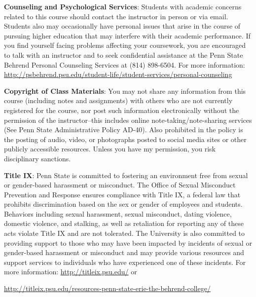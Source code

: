 \documentclass[11pt]{article}
\begin{document}
\vspace*{.10in}
\noindent\textbf{Counseling and Psychological Services}:
Students with academic concerns related to this course should contact the instructor in person or via email. Students also may occasionally have personal issues that arise in the course of pursuing higher education that may interfere with their academic performance. If you find yourself facing problems affecting your coursework, you are encouraged to talk with an instructor and to seek confidential assistance at the Penn State Behrend Personal Counseling Services at (814) 898-6504.
For more information: 
\url{http://psbehrend.psu.edu/student-life/student-services/personal-counseling}

\vspace*{.10in}
\noindent\textbf{Copyright of Class Materials}:
You may not share any information from this course (including notes and assignments) with others who are not currently registered for the course, nor post such information electronically without the permission of the instructor--this includes online note-taking/note-sharing services (See Penn State Administrative Policy AD-40).  Also prohibited in the policy is the posting of audio, video, or photographs posted to social media sites or other publicly accessible resources.  Unless you have my permission, you risk disciplinary sanctions.

\vspace*{.10in}
\noindent\textbf{Title IX}:
Penn State is committed to fostering an environment free from sexual or gender-based harassment or misconduct. The Office of Sexual Misconduct Prevention and Response ensures compliance with Title IX, a federal law that prohibits discrimination based on the sex or gender of employees and students.  Behaviors including sexual harassment, sexual misconduct, dating violence, domestic violence, and stalking, as well as retaliation for reporting any of these acts violate Title IX and are not tolerated. The University is also committed to providing support to those who may have been impacted by incidents of sexual or gender-based harassment or misconduct and may provide various resources and support services to individuals who have experienced one of these incidents.
For more information: \url{http://titleix.psu.edu/} or
\begin{center}
\url{http://titleix.psu.edu/resources-penn-state-erie-the-behrend-college/}
\end{center}
\end{document}
